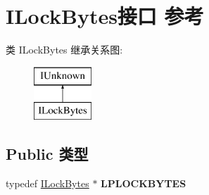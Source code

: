 \hypertarget{interface_i_lock_bytes}{}\section{I\+Lock\+Bytes接口 参考}
\label{interface_i_lock_bytes}
类 I\+Lock\+Bytes 继承关系图\+:\begin{figure}[H]
\begin{center}
\leavevmode
\includegraphics[height=2.000000cm]{interface_i_lock_bytes}
\end{center}
\end{figure}
\subsection*{Public 类型}
\begin{DoxyCompactItemize}
\item 
\mbox{\label{interface_i_lock_bytes_a1e793de0ac0c4b328fb183b8e64b7e98}} 
typedef \hyperlink{interface_i_lock_bytes}{I\+Lock\+Bytes} $\ast$ {\bfseries L\+P\+L\+O\+C\+K\+B\+Y\+T\+ES}
\end{DoxyCompactItemize}
